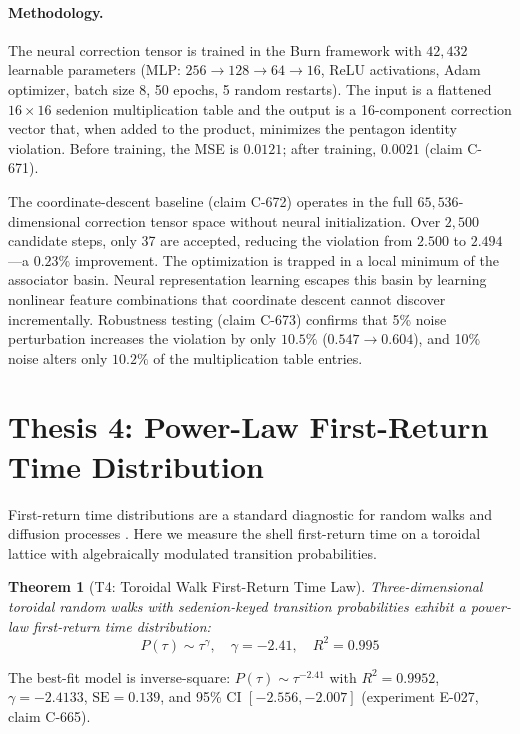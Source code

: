 \documentclass[12pt,openany]{report}
\theoremstyle{definition}
\theoremstyle{plain}
\newtheorem{theorem}{Theorem}[chapter]
\theoremstyle{remark}
\begin{document}
\paragraph{Methodology.}
The neural correction tensor is trained in the Burn framework with
$42{,}432$ learnable parameters (MLP: $256 \to 128 \to 64 \to 16$, ReLU
activations, Adam optimizer, batch size 8, 50 epochs, 5 random restarts).
The input is a flattened $16 \times 16$ sedenion multiplication table and
the output is a 16-component correction vector that, when added to the
product, minimizes the pentagon identity violation.  Before training, the
MSE is $0.0121$; after training, $0.0021$ (claim C-671).

The coordinate-descent baseline (claim C-672) operates in the full
$65{,}536$-dimensional correction tensor space without neural
initialization.  Over $2{,}500$ candidate steps, only 37 are accepted,
reducing the violation from $2.500$ to $2.494$---a $0.23\%$ improvement.
The optimization is trapped in a local minimum of the associator basin.
Neural representation learning escapes this basin by learning nonlinear
feature combinations that coordinate descent cannot discover
incrementally.  Robustness testing (claim C-673) confirms that 5\% noise
perturbation increases the violation by only $10.5\%$ ($0.547 \to 0.604$),
and 10\% noise alters only $10.2\%$ of the multiplication table entries.

\section{Thesis 4: Power-Law First-Return Time Distribution}

First-return time distributions are a standard diagnostic for random
walks and diffusion processes \citep{Redner2001FirstPassage}.  Here we
measure the shell first-return time on a toroidal lattice with
algebraically modulated transition probabilities.

\begin{theorem}[T4: Toroidal Walk First-Return Time Law]
Three-dimensional toroidal random walks with sedenion-keyed transition
probabilities exhibit a power-law first-return time distribution:
\begin{equation}
  P(\tau) \sim \tau^{\gamma}, \quad \gamma = -2.41, \quad R^2 = 0.995
  \label{eq:latency}
\end{equation}
\end{theorem}

The best-fit model is inverse-square: $P(\tau) \sim \tau^{-2.41}$ with
$R^2 = 0.9952$, $\gamma = -2.4133$, $\mathrm{SE} = 0.139$, and 95\% CI
$[-2.556, -2.007]$ (experiment E-027, claim C-665).
\end{document}
